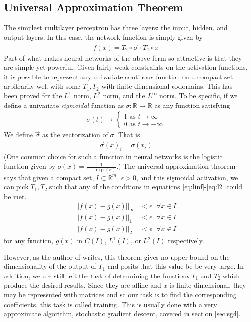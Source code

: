\subsection{Universal Approximation Theorem}
The simplest multilayer perceptron has three layers: the input, hidden, and output layers.  In this case, the network function is simply given by
\begin{align}
f(x) = T_2 \circ \vec{\sigma} \circ T_1 \circ x
\end{align}
Part of what makes neural networks of the above form so attractive is that they are simple yet powerful.  Given fairly weak constraints on the activation functions, it is possible to represent any univariate continous function on a compact set arbitrarily well with some $T_1,T_2$ with finite dimensional codomains. \cite{gc89} This has been proved for the $L^1$ norm, $L^2$ norm, and the $L^\infty$ norm.  To be specific, if we define a univariate \textit{sigmoidal} function as $\sigma: \mathbb{R}\rightarrow \mathbb{R}$ as any function satisfying
\begin{align}
\sigma(t) \rightarrow
\begin{cases}
1 \text{ as } t\rightarrow \infty\\
0 \text{ as } t\rightarrow -\infty
\end{cases}
\end{align}
We define $\vec{\sigma}$ as the vectorization of $\sigma$.  That is, 
\begin{align}
\vec{\sigma}(x)_i = \sigma(x_i)
\end{align}
(One common choice for such a function in neural networks is the logistic function given by $\sigma(x) = \frac{1}{1-\exp(x)}$.)  The universal approximation theorem says that given a compact set, $I\subset \mathbb{R}^m$, $\epsilon > 0$, and this sigmoidal activation, we can pick $T_1,T_2$ such that any of the conditions in equations \ref{eq:linf}-\ref{eq:l2} could be met.
\begin{align}
\label{eq:linf}||f(x) - g(x)||_\infty &< \epsilon \text{ } \forall x\in I \\
\label{eq:l1}||f(x) - g(x)||_1 &< \epsilon \text{ } \forall x\in I\\
\label{eq:l2}||f(x) - g(x)||_2 &< \epsilon \text{ } \forall x\in I
\end{align}
for any function, $g(x)$ in $C(I)$, $L^1(I)$, or $L^2(I)$ respectively.

However, as the author of \cite{gc89} writes, this theorem gives no upper bound on the dimensionality of the output of $T_1$ and posits that this value be be very large.  In addition, we are still left the task of determining the functions $T_1$ and $T_2$ which produce the desired results.  Since they are affine and $x$ is finite dimensional, they may be represented with matrices and so our task is to find the corresponding coefficients, this task is called training.  This is usually done with a very approximate algorithm, stochastic gradient descent, covered in section \ref{sec:sgd}.  

